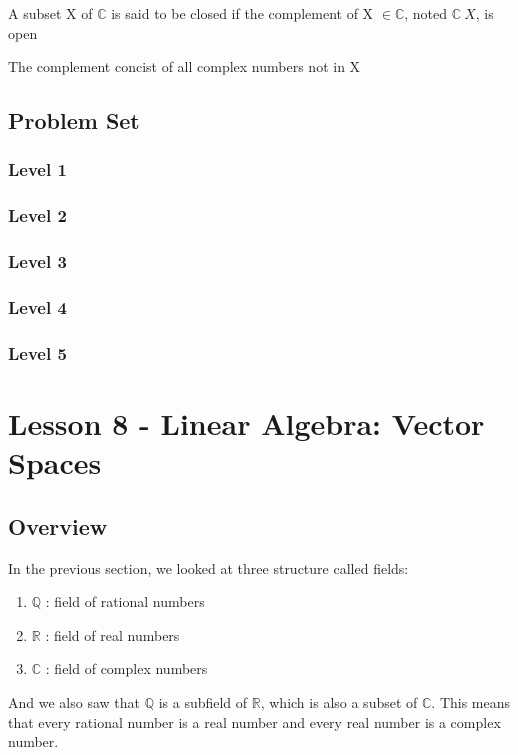 \documentclass{article}
\begin{document}
\begin{theorem}
    A subset X of $\mathbb{C}$ is said to be closed if the complement of X
    $\in \mathbb{C}$, noted $\mathbb{C} \ X$, is open

    The complement concist of all complex numbers not in X
\end{theorem}

\subsection{Problem Set}
\subsubsection{Level 1}
\subsubsection{Level 2}
\subsubsection{Level 3}
\subsubsection{Level 4}
\subsubsection{Level 5}
\pagebreak

\section{Lesson 8 - Linear Algebra: Vector Spaces}
\subsection{Overview}

In the previous section, we looked at three structure called fields:

\begin{enumerate}
    \item $\mathbb{Q}$ : field of rational numbers
    \item $\mathbb{R}$ : field of real numbers
    \item $\mathbb{C}$ : field of complex numbers
\end{enumerate}

And we also saw that $\mathbb{Q}$ is a subfield of $\mathbb{R}$, which is also
a subset of $\mathbb{C}$. This means that every rational number is a real number
and every real number is a complex number.
\end{document}
